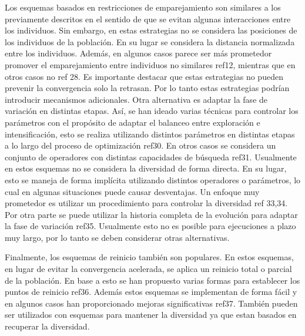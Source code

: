 Los esquemas basados en restricciones de emparejamiento son similares a los previamente descritos en el sentido de que se evitan algunas interacciones entre los individuos.
%
Sin embargo, en estas estrategias no se considera las posiciones de los individuos de la población.
%
En su lugar se considera la distancia normalizada entre los individuos.
%
Además, en algunos casos parece ser más prometedor promover el emparejamiento entre individuos no similares ref12, mientras que en otros casos no ref 28.
%
Es importante destacar que estas estrategias no pueden prevenir la convergencia solo la retrasan.
%
Por lo tanto estas estrategias podrían introducir mecanismos adicionales.
%
Otra alternativa es adaptar la fase de variación en distintas etapas.
%
Así, se han ideado varias técnicas para controlar los parámetros con el propósito de adaptar el balanceo entre exploración e intensificación, esto se realiza utilizando distintos parámetros en distintas etapas a lo largo del proceso de optimización ref30.
%
En otros casos se considera un conjunto de operadores con distintas capacidades de búsqueda ref31.
%
Usualmente en estos esquemas no se considera la diversidad de forma directa.
%
En su lugar, esto se maneja de forma implícita utilizando distintos operadores o parámetros, lo cual en algunas situaciones puede causar desventajas.
%
Un enfoque muy prometedor es utilizar un procedimiento para controlar la diversidad ref 33,34.
%
Por otra parte se puede utilizar la historia completa de la evolución para adaptar la fase de variación ref35.
%
Usualmente esto no es posible para ejecuciones a plazo muy largo, por lo tanto se deben considerar otras alternativas.
%

Finalmente, los esquemas de reinicio también son populares.
%
En estos esquemas, en lugar de evitar la convergencia acelerada, se aplica un reinicio total o parcial de la población.
%
En base a esto se han propuesto varias formas para establecer los puntos de reinicio ref36.
%
Además estos esquemas se implementan de forma fácil y en algunos casos han proporcionado mejoras significativas ref37.
%
También pueden ser utilizados con esquemas para mantener la diversidad ya que estan basados en recuperar la diversidad.
%

